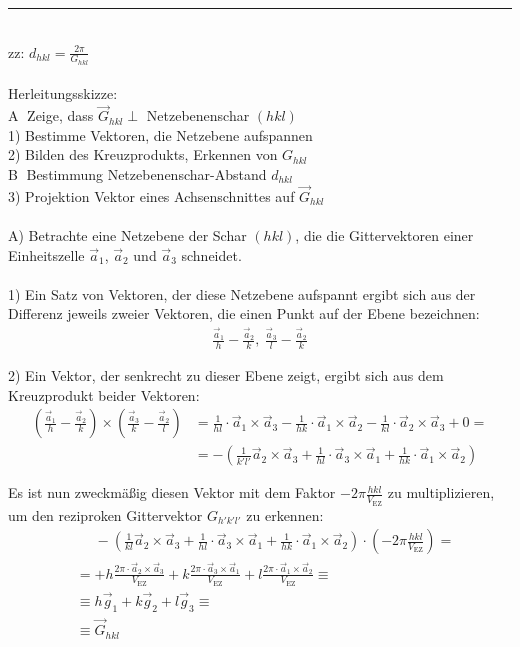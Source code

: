 \documentclass{article}
\newcommand{\lr}[1]{\left(#1\right)}
\begin{document}
{\color{violet}
\hrule
	\\
	zz: $d_{hkl} = \frac{2\pi}{G_{hkl}}$\\
	\\
	Herleitungsskizze:\\
	\textcircled{A} Zeige, dass $\vec{G}_{hkl} \perp$ Netzebenenschar $(hkl)$ \\
	1) Bestimme Vektoren, die Netzebene aufspannen \\
	2) Bilden des Kreuzprodukts, Erkennen von $G_{hkl}$ \\
	\textcircled{B} Bestimmung Netzebenenschar-Abstand $d_{hkl}$ \\
	3) Projektion Vektor eines Achsenschnittes auf $\vec{G}_{hkl}$ \\
	\\
	A) Betrachte eine Netzebene der Schar $(hkl)$, die die Gittervektoren einer Einheitszelle $\vec{a}_1$, $\vec{a}_2$ und $\vec{a}_3$ schneidet.\\
	\\
	1) Ein Satz von Vektoren, der diese Netzebene aufspannt ergibt sich aus der Differenz jeweils zweier Vektoren, die einen Punkt auf der Ebene bezeichnen:
		\begin{align*}
			\frac{\vec{a}_1}{h} - \frac{\vec{a}_2}{k},\ \frac{\vec{a}_3}{l} - \frac{\vec{a}_2}{k}
		\end{align*}
	
	2) Ein Vektor, der senkrecht zu dieser Ebene zeigt, ergibt sich aus dem Kreuzprodukt beider Vektoren:
		\begin{align*}
			\lr{ \frac{\vec{a}_1}{h} - \frac{\vec{a}_2}{k} } \times \lr{ \frac{\vec{a}_3}{k} - \frac{\vec{a}_2}{l} } &= \frac{1}{hl} \cdot \vec{a}_1 \times \vec{a}_3 - \frac{1}{hk} \cdot \vec{a}_1 \times \vec{a}_2 - \frac{1}{kl} \cdot \vec{a}_2 \times \vec{a}_3 + 0 = \\
			&= -\lr{ \frac{1}{k'l'} \vec{a}_2 \times \vec{a}_3 + \frac{1}{hl} \cdot \vec{a}_3 \times \vec{a}_1 + \frac{1}{hk} \cdot \vec{a}_1 \times \vec{a}_2 }
		\end{align*}

	Es ist nun zweckmäßig diesen Vektor mit dem Faktor $-2\pi \frac{hkl}{V_\text{EZ}}$ zu multiplizieren, um den reziproken Gittervektor $G_{h'k'l'}$ zu erkennen:
		\begin{align*}
			&\phantom{=} -\lr{ \frac{1}{kl} \vec{a}_2 \times \vec{a}_3 + \frac{1}{hl} \cdot \vec{a}_3 \times \vec{a}_1 + \frac{1}{hk} \cdot \vec{a}_1 \times \vec{a}_2 } \cdot \lr{ -2\pi \frac{hkl}{ V_\text{EZ} } } = \\
			&= + h \frac{2\pi \cdot \vec{a}_2 \times \vec{a}_3 }{ V_\text{EZ} } + k \frac{2\pi \cdot \vec{a}_3 \times \vec{a}_1 }{ V_\text{EZ} } + l \frac{2\pi \cdot \vec{a}_1 \times \vec{a}_2 }{ V_\text{EZ} } \equiv \\
			&\equiv h\vec{g}_1 + k\vec{g}_2 + l\vec{g}_3 \equiv \\
			&\equiv \vec{G}_{hkl}
		\end{align*}

}
\end{document}
